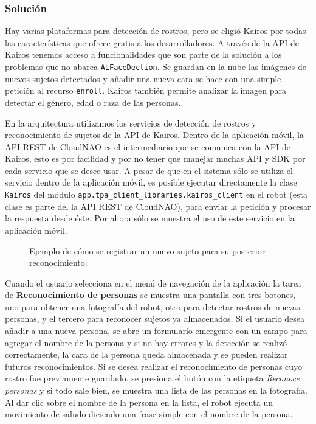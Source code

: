 \subsubsection{Solución}

Hay varias plataformas para detección de rostros, pero 
se eligió Kairos por todas las características que ofrece
gratis a los desarrolladores.
A través de la API de Kairos tenemos acceso
a funcionalidades que son parte de la solución 
a los problemas que no abarca \texttt{ALFaceDection}.
Se guardan en la nube las imágenes de nuevos sujetos
detectados y añadir una nueva cara se hace
con una simple petición al recurso \texttt{enroll}.
Kairos también permite analizar la imagen para detectar el género, 
edad o raza de las personas.

En la arquitectura utilizamos los servicios de detección de rostros y reconocimiento
de sujetos de la API de Kairos.
Dentro de la aplicación móvil, la API REST de CloudNAO es el intermediario
que se comunica con la API de Kairos, esto es por facilidad y por no
tener que manejar muchas API y SDK por cada servicio que se desee usar.
A pesar de que en el sistema sólo se utiliza el servicio
dentro de la aplicación móvil, es posible ejecutar directamente la clase
\texttt{Kairos} del módulo \texttt{app.tpa\_client\_libraries.kairos\_client}
en el robot (esta clase es parte del la API REST de CloudNAO), para enviar la petición y procesar la respuesta desde éste.
Por ahora sólo se muestra el uso de este servicio en la aplicación móvil.

\begin{figure}[htbp]
    \centering
    \qquad
    \qquad
    \caption{Ejemplo de cómo se registrar un nuevo sujeto para su posterior reconocimiento.}
\end{figure}
Cuando el usuario selecciona en el menú de navegación de la aplicación
la tarea de \textbf{Reconocimiento de personas} se muestra una pantalla 
con tres botones, uno para obtener una fotografía del robot, otro para
detectar rostros de nuevas personas, y el tercero para reconocer sujetos
ya almacenados. Si el usuario desea añadir a una nueva persona, se abre un
formulario emergente con un campo para agregar el nombre de la persona y
si no hay errores y la detección se realizó correctamente,
la cara de la persona queda almacenada y se pueden realizar futuros reconocimientos.
Si se desea realizar el reconocimiento de personas cuyo rostro
fue previamente guardado, se presiona el botón con la etiqueta
\textit{Reconoce personas} y si todo sale bien,
se muestra una lista de las personas en la fotografía.
Al dar clic sobre el nombre de la persona en la lista, el robot ejecuta
un movimiento de saludo diciendo una frase simple con el nombre de la persona.



